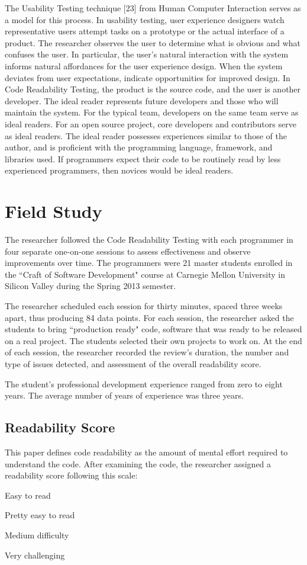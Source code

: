 \documentclass[conference]{IEEEtran}
\begin{document}
The Usability Testing technique [23] from Human Computer Interaction serves as a model for this process. In usability testing, user experience designers watch representative users attempt tasks on a prototype or the actual interface of a product. The researcher observes the user to determine what is obvious and what confuses the user. In particular, the user’s natural interaction with the system informs natural affordances for the user experience design. When the system deviates from user expectations, indicate opportunities for improved design. In Code Readability Testing, the product is the source code, and the user is another developer.
The ideal reader represents future developers and those who will maintain the system. For the typical team, developers on the same team serve as ideal readers. For an open source project, core developers and contributors serve as ideal readers. The ideal reader possesses experiences similar to those of the author, and is proficient with the programming language, framework, and libraries used. If programmers expect their code to be routinely read by less experienced programmers, then novices would be ideal readers.

\section{Field Study}
The researcher followed the Code Readability Testing with each programmer in four separate one-on-one sessions to assess effectiveness and observe improvements over time. The programmers were 21 master students enrolled in the ``Craft of Software Development" course at Carnegie Mellon University in Silicon Valley during the Spring 2013 semester.

The researcher scheduled each session for thirty minutes, spaced three weeks apart, thus producing 84 data points. For each session, the researcher asked the students to bring ``production ready" code, software that was ready to be released on a real project. The students selected their own projects to work on. At the end of each session, the researcher recorded the review’s duration, the number and type of issues detected, and assessment of the overall readability score.

The student’s professional development experience ranged from zero to eight years. The average number of years of experience was three years.

\subsection{Readability Score}
This paper defines code readability as the amount of mental effort required to understand the code. After examining the code, the researcher assigned a readability score following this scale:
\begin{etaremune}
  \item Easy to read
  \item Pretty easy to read
  \item Medium difficulty
  \item Very challenging
\end{etaremune}
  
\end{document}
